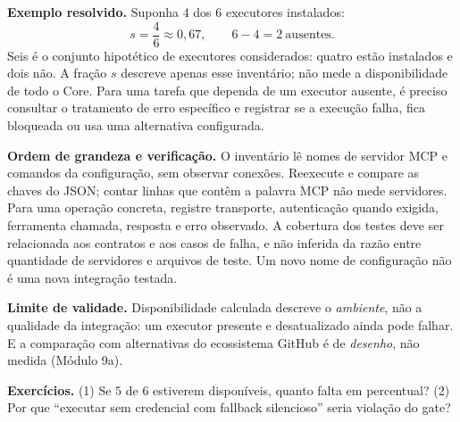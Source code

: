 \begin{resultado}
\textbf{Exemplo resolvido.} Suponha $4$ dos $6$ executores instalados:
\[ s = \frac{4}{6} \approx 0{,}67, \qquad 6-4=2\ \mathrm{ausentes}. \]
Seis é o conjunto hipotético de executores considerados: quatro estão
instalados e dois não. A fração $s$ descreve apenas esse inventário; não mede a
disponibilidade de todo o Core. Para uma tarefa que dependa de um executor
ausente, é preciso consultar o tratamento de erro específico e registrar se a
execução falha, fica bloqueada ou usa uma alternativa configurada.
\end{resultado}

\begin{resultado}
\textbf{Ordem de grandeza e verificação.} O inventário lê \CoreMCPCount{} nomes
de servidor MCP e \CoreCommandCount{} comandos da configuração, sem observar
conexões. Reexecute  e compare as chaves do JSON; contar
linhas que contêm a palavra MCP não mede servidores. Para uma operação concreta,
registre transporte, autenticação quando exigida, ferramenta chamada, resposta
e erro observado. A cobertura dos testes deve ser relacionada aos contratos e
aos casos de falha, e não inferida da razão entre quantidade de servidores e
arquivos de teste. Um novo nome de configuração não é uma nova integração testada.
\end{resultado}

\begin{aviso}
\textbf{Limite de validade.} Disponibilidade calculada descreve o \emph{ambiente},
não a qualidade da integração: um executor presente e desatualizado ainda pode
falhar. E a comparação com alternativas do ecossistema GitHub é de \emph{desenho},
não medida (Módulo 9a).
\end{aviso}

\begin{resultado}
\textbf{Exercícios.} (1) Se $5$ de $6$ estiverem disponíveis, quanto falta em
percentual? (2) Por que ``executar sem credencial com fallback silencioso'' seria
violação do gate?
\end{resultado}

\clearpage

